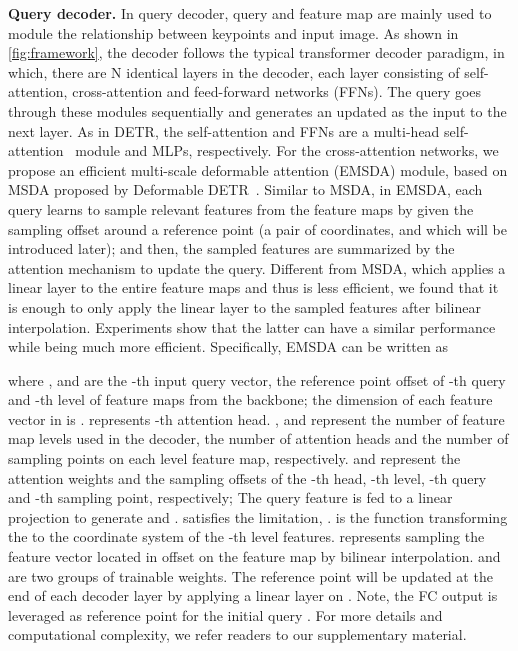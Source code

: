\documentclass[runningheads]{llncs}
\begin{document}
\noindent\textbf{Query decoder.} 
In query decoder, query and feature map are mainly used to module the relationship between keypoints and input image. As shown in \cref{fig:framework}, the decoder follows the typical transformer decoder paradigm, in which,
there are N identical layers in the decoder, each layer consisting of self-attention, cross-attention and feed-forward networks (FFNs). The query  goes through these modules sequentially and generates an updated  as the input to the next layer. As in DETR\cite{carion2020end}, the self-attention and FFNs are a multi-head self-attention~\cite{vaswani2017attention} module and MLPs, respectively. 
For the cross-attention networks, we propose an efficient multi-scale deformable attention (EMSDA) module, based on MSDA proposed by Deformable DETR~\cite{zhu2020deformable}. Similar to MSDA, in EMSDA, each query learns to sample relevant features from the feature maps by given the sampling offset around a reference point (a pair of coordinates, and which will be introduced later); and then, the sampled features are summarized by the attention mechanism to update the query. Different from MSDA, which applies a linear layer to the entire feature maps and thus is less efficient, we found that it is enough to only apply the linear layer to the sampled features after bilinear interpolation. Experiments show that the latter can have a similar performance while being much more efficient. Specifically, EMSDA can be written as 

where ,  and  are the -th input query vector, the reference point offset of -th query and -th level of feature maps from the backbone; the dimension of each feature vector in  is .  represents -th attention head. ,  and  represent the number of feature map levels used in the decoder, the number of attention heads and the number of sampling points on each level feature map, respectively.  and  represent the attention weights and the sampling offsets of the -th head, -th level, -th query and -th sampling point, respectively; The query feature  is fed to a linear projection to generate  and .
 satisfies the limitation, .  is the function transforming the  to the coordinate system of the -th level features.  represents sampling the feature vector located in offset  on the feature map  by bilinear interpolation.  and  are two groups of trainable weights. The reference point  will be updated at the end of each decoder layer by applying a linear layer on . Note, the FC output  is leveraged as reference point for the initial query . For more details and computational complexity, we refer readers to our supplementary material. 
\end{document}
